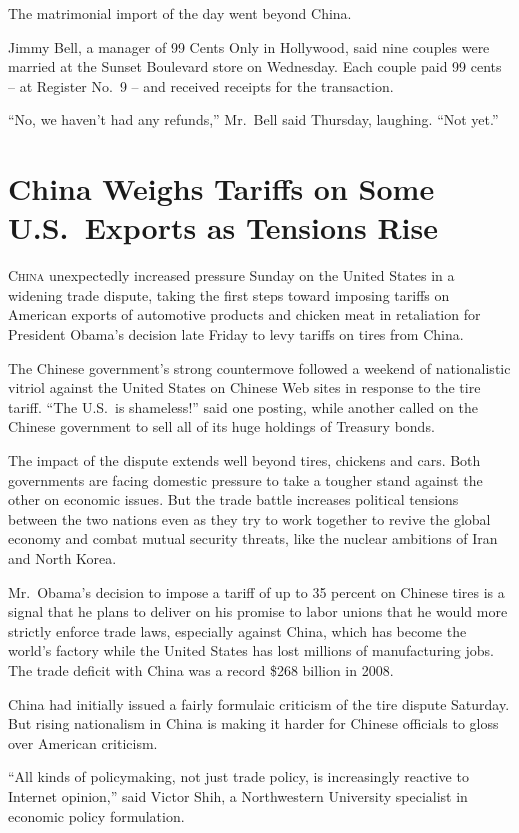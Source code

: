 ﻿\documentclass[12pt]{article}
\begin{document}
The matrimonial import of the day went beyond China.

Jimmy Bell, a manager of 99 Cents Only in Hollywood, said nine couples were married at the Sunset
Boulevard store on Wednesday. Each couple paid 99 cents -- at Register No.~9 -- and received
receipts for the transaction.

``No, we haven't had any refunds,'' Mr.~Bell said Thursday, laughing. ``Not yet.''

\section{China Weighs Tariffs on Some U.S.~Exports as Tensions Rise}

\lettrine{C}{hina} unexpectedly increased pressure Sunday on the United States in a widening trade
dispute, taking the first steps toward imposing tariffs on American exports of automotive products
and chicken meat in retaliation for President Obama's decision late Friday to levy\cite{levy}
tariffs on tires from China.

The Chinese government's strong countermove followed a weekend of nationalistic
vitriol\cite{vitriol} against the United States on Chinese Web sites in response to the tire tariff.
``The U.S.~is shameless!'' said one posting, while another called on the Chinese government to sell
all of its huge holdings of Treasury bonds.

The impact of the dispute extends well beyond tires, chickens and cars. Both governments are facing
domestic pressure to take a tougher stand against the other on economic issues. But the trade battle
increases political tensions between the two nations even as they try to work together to revive the
global economy and combat mutual security threats, like the nuclear ambitions of Iran and North
Korea.

Mr.~Obama's decision to impose a tariff of up to 35 percent on Chinese tires is a signal that he
plans to deliver on his promise to labor unions that he would more strictly enforce trade laws,
especially against China, which has become the world's factory while the United States has lost
millions of manufacturing jobs. The trade deficit with China was a record \$268 billion in 2008.

China had initially issued a fairly formulaic criticism of the tire dispute Saturday. But rising
nationalism in China is making it harder for Chinese officials to gloss over American criticism.

``All kinds of policymaking, not just trade policy, is increasingly reactive to Internet opinion,''
said Victor Shih, a Northwestern University specialist in economic policy formulation.
\end{document}
